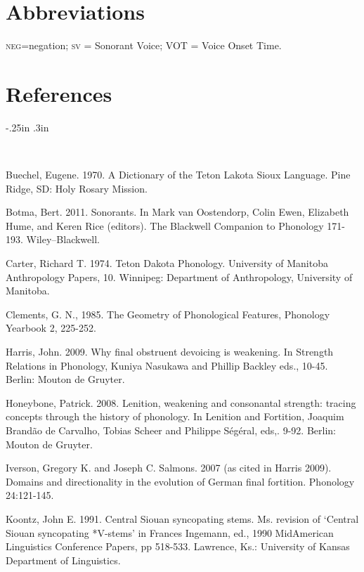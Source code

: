 \documentclass[output=paper]{LSP/langsci}
\begin{document}
\section*{Abbreviations}
\textsc{neg}=negation; \textsc{sv} = Sonorant Voice; VOT = Voice Onset Time.

\section*{References}

\newenvironment{reflist} {\begin{list} {} {\listparindent -.25in
\leftmargin .3in} \item \ \vspace{-.3in} } {\end{list} }

\begin{reflist}


Buechel, Eugene. 1970. A Dictionary of the Teton Lakota Sioux Language. Pine Ridge, SD: Holy Rosary Mission.

Botma, Bert. 2011. Sonorants. In Mark van Oostendorp, Colin Ewen, Elizabeth Hume, and Keren Rice (editors). The Blackwell Companion to Phonology 171-193. Wiley--Blackwell.

Carter, Richard T. 1974. Teton Dakota Phonology. University of Manitoba Anthropology Papers, 10. Winnipeg: Department of Anthropology, University of Manitoba.

Clements, G. N., 1985. The Geometry of Phonological Features, Phonology Yearbook 2, 225-252.

Harris, John. 2009. Why final obstruent devoicing is weakening. In Strength Relations in Phonology, Kuniya Nasukawa and Phillip Backley eds., 10-45. Berlin: Mouton de Gruyter.

Honeybone, Patrick. 2008. Lenition, weakening and consonantal strength: tracing concepts through the history of phonology. In Lenition and Fortition, Joaquim Brand\~{a}o de Carvalho, Tobias Scheer and Philippe S\'eg\'eral, eds,. 9-92. Berlin: Mouton de Gruyter.

Iverson, Gregory K. and Joseph C. Salmons. 2007 (as cited in Harris 2009). Domains and directionality in the evolution of German final fortition. Phonology 24:121-145.

Koontz, John E. 1991. Central Siouan syncopating stems. Ms. revision of `Central Siouan syncopating *V-stems' in Frances Ingemann, ed., 1990 MidAmerican Linguistics Conference Papers, pp 518-533. Lawrence, Ks.: University of Kansas Department of Linguistics.


\end{reflist}
\end{document}
